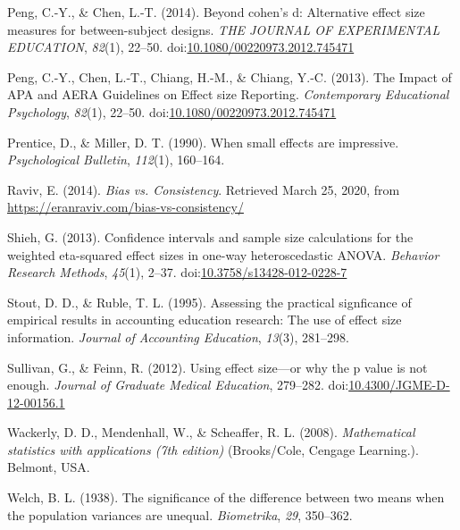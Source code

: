 \documentclass[
  man,floatsintext]{apa6}
\begin{document}
\leavevmode\hypertarget{ref-Peng_and_Chen_2014}{}%
Peng, C.-Y., \& Chen, L.-T. (2014). Beyond cohen's d: Alternative effect size measures for between-subject designs. \emph{THE JOURNAL OF EXPERIMENTAL EDUCATION}, \emph{82}(1), 22--50. doi:\href{https://doi.org/10.1080/00220973.2012.745471}{10.1080/00220973.2012.745471}

\leavevmode\hypertarget{ref-Peng_et_al_2013}{}%
Peng, C.-Y., Chen, L.-T., Chiang, H.-M., \& Chiang, Y.-C. (2013). The Impact of APA and AERA Guidelines on Effect size Reporting. \emph{Contemporary Educational Psychology}, \emph{82}(1), 22--50. doi:\href{https://doi.org/10.1080/00220973.2012.745471}{10.1080/00220973.2012.745471}

\leavevmode\hypertarget{ref-Prentice_Miller_1992}{}%
Prentice, D., \& Miller, D. T. (1990). When small effects are impressive. \emph{Psychological Bulletin}, \emph{112}(1), 160--164.

\leavevmode\hypertarget{ref-Raviv}{}%
Raviv, E. (2014). \emph{Bias vs. Consistency}. Retrieved March 25, 2020, from \url{https://eranraviv.com/bias-vs-consistency/}

\leavevmode\hypertarget{ref-Shieh_2013}{}%
Shieh, G. (2013). Confidence intervals and sample size calculations for the weighted eta-squared effect sizes in one-way heteroscedastic ANOVA. \emph{Behavior Research Methods}, \emph{45}(1), 2--37. doi:\href{https://doi.org/10.3758/s13428-012-0228-7}{10.3758/s13428-012-0228-7}

\leavevmode\hypertarget{ref-Stout_Ruble_1995}{}%
Stout, D. D., \& Ruble, T. L. (1995). Assessing the practical signficance of empirical results in accounting education research: The use of effect size information. \emph{Journal of Accounting Education}, \emph{13}(3), 281--298.

\leavevmode\hypertarget{ref-Sullivan_Feinn_2012}{}%
Sullivan, G., \& Feinn, R. (2012). Using effect size---or why the p value is not enough. \emph{Journal of Graduate Medical Education}, 279--282. doi:\href{https://doi.org/10.4300/JGME-D-12-00156.1}{10.4300/JGME-D-12-00156.1}

\leavevmode\hypertarget{ref-Wackerly_et_al_2008}{}%
Wackerly, D. D., Mendenhall, W., \& Scheaffer, R. L. (2008). \emph{Mathematical statistics with applications (7th edition)} (Brooks/Cole, Cengage Learning.). Belmont, USA.

\leavevmode\hypertarget{ref-Welch_1938}{}%
Welch, B. L. (1938). The significance of the difference between two means when the population variances are unequal. \emph{Biometrika}, \emph{29}, 350--362.
\end{document}
